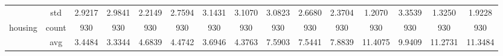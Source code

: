 \begin{table}[H]
{\begin{tabular}{rcccc|c|c|c|c|c|ccccc}
			                                                                               & std                                    & 2.9217                                                                             & 2.9841                                                                    & 2.2149                                                                    & 2.7594                                         & 3.1431                                                                    & 3.1070                                       & 3.0823                                      & 2.6680                                         & 2.3704                                         & 1.2070                                          & 3.3539                                          & 1.3250                                         & 1.9228                                         \\
			housing                                                                        & count                                  & 930                                                                                & 930                                                                       & 930                                                                       & 930                                            & 930                                                                       & 930                                          & 930                                         & 930                                            & 930                                            & 930                                             & 930                                             & 930                                            & 930                                            \\
			                                                                               & avg                                    & 3.4484                                                                             & \cellcolor[rgb]{ .776,  .937,  .808}\textcolor[rgb]{ 0,  .38,  0}{3.3344} & 4.6839                                                                    & 4.4742                                         & 3.6946                                                                    & 4.3763                                       & 7.5903                                      & 7.5441                                         & 7.8839                                         & 11.4075                                         & 9.9409                                          & 11.2731                                        & 11.3484                                        \\

\end{tabular}}
\end{table}
